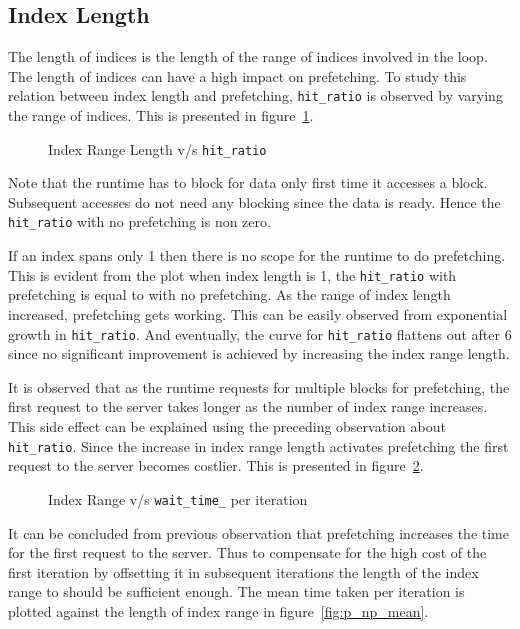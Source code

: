 \subsection{Index Length}
The length of indices is the length of the range of indices involved in the loop.
The length of indices can have a high impact on prefetching. To study this relation
between index length and prefetching, \texttt{hit\_ratio} is observed by varying
the range of indices. This is presented in figure~\ref{fig:hitratio}.
\begin{figure}[h]
  
  \caption{Index Range Length v/s \texttt{hit\_ratio}}
  \label{fig:hitratio}
\end{figure}

Note that the runtime has to block for data only first time it accesses a block.
Subsequent accesses do not need any blocking since the data is ready. Hence the
\texttt{hit\_ratio} with no prefetching is non zero.

If an index spans only 1 then there is no scope for the runtime to do prefetching.
This is evident from the plot when index length is 1, the \texttt{hit\_ratio} with
prefetching is equal to with no prefetching. As the range of index length increased,
prefetching gets working. This can be easily observed from exponential growth in
\texttt{hit\_ratio}. And eventually, the curve for \texttt{hit\_ratio} flattens out
after 6 since no significant improvement is achieved by increasing the index range
length.

It is observed that as the runtime requests for multiple blocks for prefetching,
the first request to the server takes longer as the number of index range increases. This
side effect can be explained using the preceding observation about \texttt{hit\_ratio}.
Since the increase in index range length activates prefetching the first request
to the server becomes costlier. This is presented in figure~\ref{fig:p_first_mean}.
\begin{figure}[h]
  
  \caption{Index Range v/s \texttt{wait\_time\_} per iteration}
  \label{fig:p_first_mean}
\end{figure}

It can be concluded from previous observation that prefetching increases the time
for the first request to the server. Thus to compensate for the high cost of the first
iteration by offsetting it in subsequent iterations the length of the index range to
should be sufficient enough. The mean time taken per iteration is plotted against
the length of index range in figure~\ref{fig:p_np_mean}.

